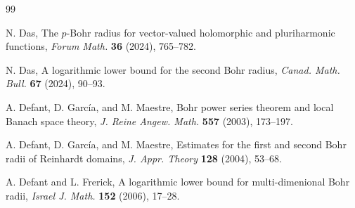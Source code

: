 \documentclass[a4paper,11pt, reqno]{amsart}
\theoremstyle{definition}
\begin{document}
\begin{thebibliography}{99}
	
	
	
	
	
	
	
	 {\sc N. Das}, The $p$-Bohr radius for vector-valued holomorphic and pluriharmonic functions, {\it Forum Math.} {\bf 36} (2024), 765--782.
	
	 {\sc N. Das}, A logarithmic lower bound for the second Bohr radius, {\it Canad. Math. Bull.} {\bf 67} (2024), 90--93.
	
	 {\sc A. Defant, D. Garc\'{i}a}, and {\sc  M. Maestre}, Bohr power series theorem and local Banach space theory, {\it J. Reine Angew. Math.} {\bf 557} (2003), 173--197.
	
	 {\sc A. Defant, D. Garc\'{i}a}, and {\sc  M. Maestre}, Estimates for the first and second Bohr radii of Reinhardt domains, {\it J. Appr. Theory} {\bf 128} (2004), 53--68.
	
	 {\sc A. Defant} and {\sc L. Frerick}, A logarithmic lower bound for multi-dimenional Bohr radii, {\it Israel J. Math.} {\bf 152} (2006), 17--28.
	

\end{thebibliography}
\end{document}
